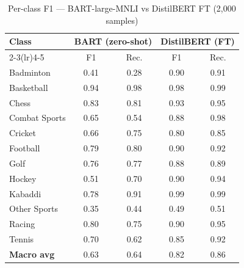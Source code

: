 \documentclass[11pt,a4paper]{article}
\begin{document}
\begin{table}[H]\centering
\caption{Per-class F1 — BART-large-MNLI vs DistilBERT FT (2,000 samples)}
\small
\begin{tabular}{lcccc}
\toprule
\multirow{2}{*}{\textbf{Class}} & \multicolumn{2}{c}{\textbf{BART (zero-shot)}} & \multicolumn{2}{c}{\textbf{DistilBERT (FT)}}\\
\cmidrule(lr){2-3}\cmidrule(lr){4-5}
 & F1 & Rec. & F1 & Rec.\\
\midrule
Badminton     & 0.41 & 0.28 & 0.90 & 0.91\\
Basketball    & 0.94 & 0.98 & 0.98 & 0.99\\
Chess         & 0.83 & 0.81 & 0.93 & 0.95\\
Combat Sports & 0.65 & 0.54 & 0.88 & 0.98\\
Cricket       & 0.66 & 0.75 & 0.80 & 0.85\\
Football      & 0.79 & 0.80 & 0.90 & 0.92\\
Golf          & 0.76 & 0.77 & 0.88 & 0.89\\
Hockey        & 0.51 & 0.70 & 0.90 & 0.94\\
Kabaddi       & 0.78 & 0.91 & 0.99 & 0.99\\
Other Sports  & 0.35 & 0.44 & 0.49 & 0.51\\
Racing        & 0.80 & 0.75 & 0.90 & 0.95\\
Tennis        & 0.70 & 0.62 & 0.85 & 0.92\\
\midrule
\textbf{Macro avg} & 0.63 & 0.64 & 0.82 & 0.86\\
\bottomrule
\end{tabular}
\end{table}
\end{document}

